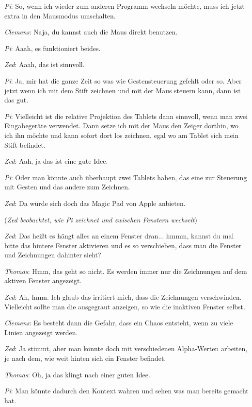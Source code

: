 \medskip \emph{Pi}: So, wenn ich wieder zum anderen Programm wechseln möchte, muss ich jetzt extra in den Mausmodus umschalten.

\medskip \emph{Clemens}: Naja, du kannst auch die Maus direkt benutzen.

\medskip \emph{Pi}: Aaah, es funktioniert beides.

\medskip \emph{Zed}: Aaah, das ist sinnvoll.

\medskip \emph{Pi}: Ja, mir hat die ganze Zeit so was wie Gestensteuerung gefehlt oder so. Aber jetzt wenn ich mit dem Stift zeichnen und mit der Maus steuern kann, dann ist das gut.

\medskip \emph{Pi}: Vielleicht ist die relative Projektion des Tablets dann sinnvoll, wenn man zwei Eingabegeräte verwendet. Dann setze ich mit der Maus den Zeiger dorthin, wo ich ihn möchte und kann sofort dort los zeichnen, egal wo am Tablet sich mein Stift befindet.

\medskip \emph{Zed}: Aah, ja das ist eine gute Idee.

\medskip \emph{Pi}: Oder man könnte auch überhaupt zwei Tablets haben, das eine zur Steuerung mit Gesten und das andere zum Zeichnen.

\medskip \emph{Zed}: Da würde sich doch das Magic Pad von Apple anbieten.

\medskip (\emph{Zed beobachtet, wie Pi zeichnet und zwischen Fenstern wechselt})

\medskip \emph{Zed}: Das heißt es hängt alles an einem Fenster dran... hmmm, kannst du mal bitte das hintere Fenster aktivieren und es so verschieben, dass man die Fenster und Zeichnungen dahinter sieht?

\medskip \emph{Thomas}: Hmm, das geht so nicht. Es werden immer nur die Zeichnungen auf dem aktiven Fenster angezeigt.

\medskip \emph{Zed}: Ah, hmm. Ich glaub das irritiert mich, dass die Zeichnungen verschwinden. Vielleicht sollte man die ausgegraut anzeigen, so wie die inaktiven Fenster selbst.

\medskip \emph{Clemens}: Es besteht dann die Gefahr, dass ein Chaos entsteht, wenn zu viele Linien angezeigt werden.

\medskip \emph{Zed}: Ja stimmt, aber man könnte doch mit verschiedenen Alpha-Werten arbeiten, je nach dem, wie weit hinten sich ein Fenster befindet.

\medskip \emph{Thomas}: Oh, ja das klingt nach einer guten Idee.

\medskip \emph{Pi}: Man könnte dadurch den Kontext wahren und sehen was man bereits gemacht hat. 

